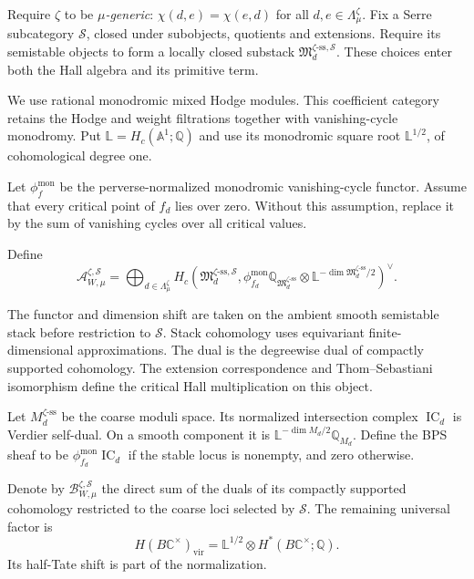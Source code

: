 Require $\zeta$ to
be \emph{$\mu$-generic}: $\chi(d,e)=\chi(e,d)$ for all
$d,e\in\Lambda^\zeta_\mu$.
Fix a Serre subcategory $\mathcal S$, closed under subobjects,
quotients and extensions. Require its semistable objects to form
a locally closed substack
$\mathfrak M_d^{\zeta\text{-ss},\mathcal S}$.
These choices enter both the Hall algebra and its primitive term.

We use rational monodromic mixed Hodge modules. This coefficient
category retains the Hodge and weight filtrations together with
vanishing-cycle monodromy. Put
$\mathbb L=H_c(\mathbb A^1;\mathbb Q)$ and use its monodromic
square root $\mathbb L^{1/2}$, of cohomological degree one.

Let $\phi_f^{\mathrm{mon}}$ be the perverse-normalized monodromic
vanishing-cycle functor. Assume that every critical point of $f_d$
lies over zero. Without this assumption, replace it by the sum
of vanishing cycles over all critical values.

Define
\[
 \mathcal A_{W,\mu}^{\zeta,\mathcal S}
 =\bigoplus_{d\in\Lambda^\zeta_\mu}
 H_c\left(\mathfrak M_d^{\zeta\text{-ss},\mathcal S},
 \phi_{f_d}^{\mathrm{mon}}\mathbb Q_{\mathfrak M_d^{\zeta\text{-ss}}}
 \otimes\mathbb L^{-\dim\mathfrak M_d^{\zeta\text{-ss}}/2}
 \right)^\vee.
\]

The functor and dimension shift are taken on the ambient smooth
semistable stack before restriction to $\mathcal S$.
Stack cohomology uses equivariant finite-dimensional approximations.
The dual is the degreewise dual of compactly supported cohomology.
The extension correspondence and Thom--Sebastiani isomorphism
define the critical Hall multiplication on this object.

Let $M_d^{\zeta\text{-ss}}$ be the coarse moduli space.
Its normalized intersection complex $\operatorname{IC}_d$ is
Verdier self-dual. On a smooth component it is
$\mathbb L^{-\dim M_d/2}\mathbb Q_{M_d}$.
Define the BPS sheaf to be
$\phi_{f_d}^{\mathrm{mon}}\operatorname{IC}_d$ if the stable
locus is nonempty, and zero otherwise.

Denote by
$\mathcal B_{W,\mu}^{\zeta,\mathcal S}$ the direct sum of the
duals of its compactly supported cohomology restricted to the
coarse loci selected by $\mathcal S$.
The remaining universal factor is
\[
 H(B\mathbb C^\times)_{\mathrm{vir}}
 =\mathbb L^{1/2}\otimes H^*(B\mathbb C^\times;\mathbb Q).
\]
Its half-Tate shift is part of the normalization.

